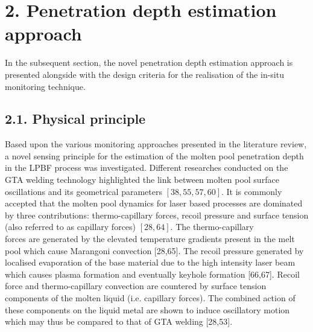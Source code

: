 \documentclass[10pt]{article}
\begin{document}
\section*{2. Penetration depth estimation approach}
In the subsequent section, the novel penetration depth estimation approach is presented alongside with the design criteria for the realisation of the in-situ monitoring technique.

\subsection*{2.1. Physical principle}
Based upon the various monitoring approaches presented in the literature review, a novel sensing principle for the estimation of the molten pool penetration depth in the LPBF process was investigated. Different researches conducted on the GTA welding technology highlighted the link between molten pool surface oscillations and its geometrical parameters $[38,55,57,60]$. It is commonly accepted that the molten pool dynamics for laser based processes are dominated by three contributions: thermo-capillary forces, recoil pressure and surface tension (also referred to as capillary forces) $[28,64]$. The thermo-capillary\\
forces are generated by the elevated temperature gradients present in the melt pool which cause Marangoni convection [28,65]. The recoil pressure generated by localised evaporation of the base material due to the high intensity laser beam which causes plasma formation and eventually keyhole formation [66,67]. Recoil force and thermo-capillary convection are countered by surface tension components of the molten liquid (i.e. capillary forces). The combined action of these components on the liquid metal are shown to induce oscillatory motion which may thus be compared to that of GTA welding [28,53].
\end{document}

